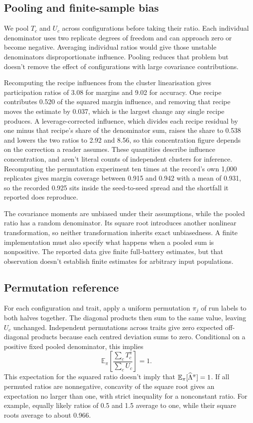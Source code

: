 \subsection{Pooling and finite-sample bias}
We pool $T_c$ and $U_c$ across configurations before taking their ratio. Each individual denominator uses two replicate degrees of freedom and can approach zero or become negative. Averaging individual ratios would give those unstable denominators disproportionate influence. Pooling reduces that problem but doesn't remove the effect of configurations with large covariance contributions.

Recomputing the recipe influences from the cluster linearisation gives participation ratios of 3.08 for margins and 9.02 for accuracy. One recipe contributes 0.520 of the squared margin influence, and removing that recipe moves the estimate by 0.037, which is the largest change any single recipe produces. A leverage-corrected influence, which divides each recipe residual by one minus that recipe's share of the denominator sum, raises the share to 0.538 and lowers the two ratios to 2.92 and 8.56, so this concentration figure depends on the correction a reader assumes. These quantities describe influence concentration, and aren't literal counts of independent clusters for inference. Recomputing the permutation experiment ten times at the record's own 1,000 replicates gives margin coverage between 0.915 and 0.942 with a mean of 0.931, so the recorded 0.925 sits inside the seed-to-seed spread and the shortfall it reported does reproduce.

The covariance moments are unbiased under their assumptions, while the pooled ratio has a random denominator. Its square root introduces another nonlinear transformation, so neither transformation inherits exact unbiasedness. A finite implementation must also specify what happens when a pooled sum is nonpositive. The reported data give finite full-battery estimates, but that observation doesn't establish finite estimates for arbitrary input populations.

\subsection{Permutation reference}
For each configuration and trait, apply a uniform permutation $\pi_j$ of run labels to both halves together. The diagonal products then sum to the same value, leaving $U_c$ unchanged. Independent permutations across traits give zero expected off-diagonal products because each centred deviation sums to zero. Conditional on a positive fixed pooled denominator, this implies
\begin{equation}
\mathbb E_\pi\left[\frac{\sum_cT_c^\pi}{\sum_cU_c}\right]=1.
\end{equation}
This expectation for the squared ratio doesn't imply that $\mathbb E_\pi[\widehat{\Lambda}^\pi]=1$. If all permuted ratios are nonnegative, concavity of the square root gives an expectation no larger than one, with strict inequality for a nonconstant ratio. For example, equally likely ratios of 0.5 and 1.5 average to one, while their square roots average to about 0.966.

